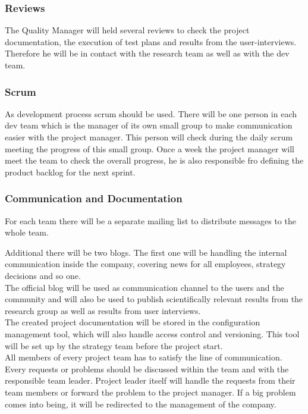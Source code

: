 \documentclass[a4paper,11pt]{article}
\begin{document}
\subsubsection{Reviews}
The Quality Manager will held several reviews to check the project documentation, the execution of test plans and results from the user-interviews. Therefore he will be in contact with the research team as well as with the dev team.

\subsubsection{Scrum}
As development process scrum should be used. There will be one person in each dev team which is the manager of its own small group to make communication easier with the project manager. This person will check during the daily scrum meeting the progress of this small group. Once a week the project manager will meet the team to check the overall progress, he is also responsible fro defining the product backlog for the next sprint.

\subsubsection{Communication and Documentation}
For each team there will be a separate mailing list to distribute messages to the whole team.

Additional there will be two blogs. The first one will be handling the internal communication inside the company, covering news for all employees, strategy decisions and so one. \\

The official blog will be used as communication channel to the users and the community and will also be used to publish scientifically relevant results from the research group as well as results from user interviews. \\

The created project documentation will be stored in the configuration management tool, which will also handle access control and versioning. This tool will be set up by the strategy team before the project start. \\

All members of every project team has to satisfy the line of communication. Every requests or problems should be discussed within the team and with the responsible team leader. Project leader itself will handle the requests from their team members or forward the problem to the project manager. If a big problem comes into being, it will be redirected to the management of the company.
\end{document}
